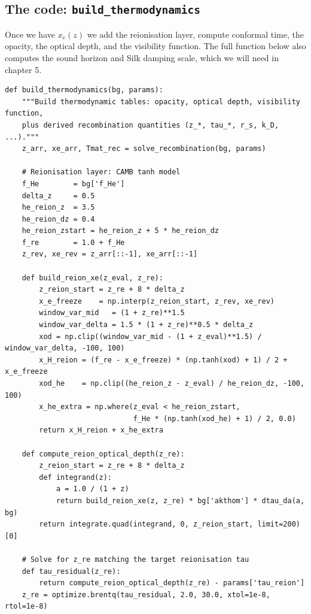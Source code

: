 \subsection{The code: \texttt{build\_thermodynamics}}

Once we have $x_e(z)$ we add the reionisation layer, compute conformal time, the opacity, the optical depth, and the visibility function. The full function below also computes the sound horizon and Silk damping scale, which we will need in chapter 5.

\begin{codebox}
\begin{lstlisting}[style=python]
def build_thermodynamics(bg, params):
    """Build thermodynamic tables: opacity, optical depth, visibility function,
    plus derived recombination quantities (z_*, tau_*, r_s, k_D, ...)."""
    z_arr, xe_arr, Tmat_rec = solve_recombination(bg, params)

    # Reionisation layer: CAMB tanh model
    f_He        = bg['f_He']
    delta_z     = 0.5
    he_reion_z  = 3.5
    he_reion_dz = 0.4
    he_reion_zstart = he_reion_z + 5 * he_reion_dz
    f_re        = 1.0 + f_He
    z_rev, xe_rev = z_arr[::-1], xe_arr[::-1]

    def build_reion_xe(z_eval, z_re):
        z_reion_start = z_re + 8 * delta_z
        x_e_freeze    = np.interp(z_reion_start, z_rev, xe_rev)
        window_var_mid   = (1 + z_re)**1.5
        window_var_delta = 1.5 * (1 + z_re)**0.5 * delta_z
        xod = np.clip((window_var_mid - (1 + z_eval)**1.5) / window_var_delta, -100, 100)
        x_H_reion = (f_re - x_e_freeze) * (np.tanh(xod) + 1) / 2 + x_e_freeze
        xod_he    = np.clip((he_reion_z - z_eval) / he_reion_dz, -100, 100)
        x_he_extra = np.where(z_eval < he_reion_zstart,
                              f_He * (np.tanh(xod_he) + 1) / 2, 0.0)
        return x_H_reion + x_he_extra

    def compute_reion_optical_depth(z_re):
        z_reion_start = z_re + 8 * delta_z
        def integrand(z):
            a = 1.0 / (1 + z)
            return build_reion_xe(z, z_re) * bg['akthom'] * dtau_da(a, bg)
        return integrate.quad(integrand, 0, z_reion_start, limit=200)[0]

    # Solve for z_re matching the target reionisation tau
    def tau_residual(z_re):
        return compute_reion_optical_depth(z_re) - params['tau_reion']
    z_re = optimize.brentq(tau_residual, 2.0, 30.0, xtol=1e-8, rtol=1e-8)


\end{lstlisting}
\end{codebox}
